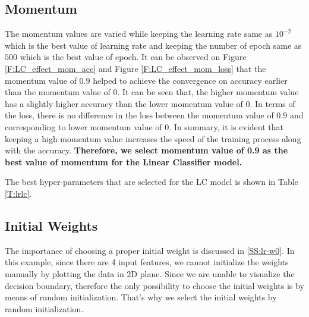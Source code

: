 \documentclass[12pt, a4paper, twoside]{article}
\begin{document}
\subsection{Momentum}\label{SS:lc-mom}
The momentum values are varied while keeping the learning rate same as $10^{-2}$ which is the best value of learning rate and keeping the number of epoch same as $500$ which is the best value of epoch. It can be observed on Figure \ref{F:LC_effect_mom_acc} and Figure \ref{F:LC_effect_mom_loss} that the momentum value of $0.9$ helped to achieve the convergence on accuracy earlier than the momentum value of 0. It can be seen that, the higher momentum value has a slightly higher accuracy than the lower momentum value of 0. In terms of the loss, there is no difference in the loss between the momentum value of $0.9$ and corresponding to lower momentum value of 0. In summary, it is evident that keeping a high momentum value increases the speed of the training process along with the accuracy. \textbf{Therefore, we select momentum value of 0.9 as the best value of momentum for the Linear Classifier model.}
\par
The best hyper-parameters that are selected for the LC model is shown in Table \ref{T:lrlc}.
\subsection{Initial Weights}\label{SS:lc-w0}
The importance of choosing a proper initial weight is discussed in \ref{SS:lr-w0}. In this example, since there are 4 input features, we cannot initialize the weights manually by plotting the data in 2D plane. Since we are unable to visualize the decision boundary, therefore the only possibility to choose the initial weights is by means of random initialization. That's why we select the initial weights by random initialization.
\end{document}
